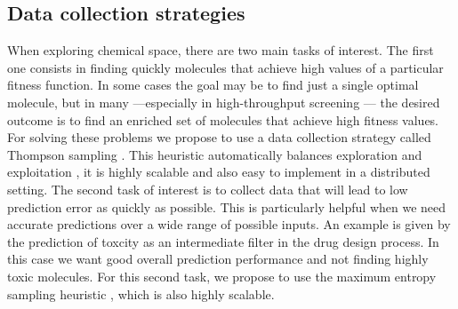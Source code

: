 \subsection{Data collection strategies}

When exploring chemical space, there are two main tasks of interest. The first one consists in finding quickly molecules that achieve high values of a particular fitness function. In some cases the goal may be to find just a single optimal molecule, but in many ---especially in high-throughput screening \cite{Pyzer_Knapp_2015a}--- the desired outcome is to find 
an enriched set of molecules that achieve high fitness values. For solving these problems we propose to use a data collection strategy called Thompson sampling \cite{Thompson_1933}. This heuristic automatically balances exploration and exploitation \cite{Chapelle2011}, it is highly scalable and also easy to implement in a distributed setting.
The second task of interest is to collect data that will lead to low prediction error as quickly as possible. This is particularly helpful when we need accurate predictions over a wide range of possible inputs. An example is given by the prediction of toxcity as an intermediate filter in the drug design process. In this case we want good overall prediction performance and not finding highly toxic molecules. For this second task, we propose to use the maximum entropy sampling heuristic \cite{MacKay_1992}, which is also highly scalable.
